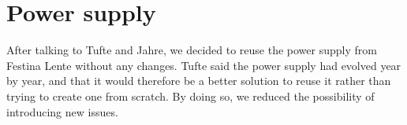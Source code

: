 \section {Power supply}
After talking to Tufte and Jahre, we decided to reuse the power supply
from Festina Lente without any changes. Tufte said the power supply had evolved year by
year, and that it would therefore be a better solution to reuse it rather
than trying to create one from scratch. By doing so, we reduced the possibility 
of introducing new issues.
